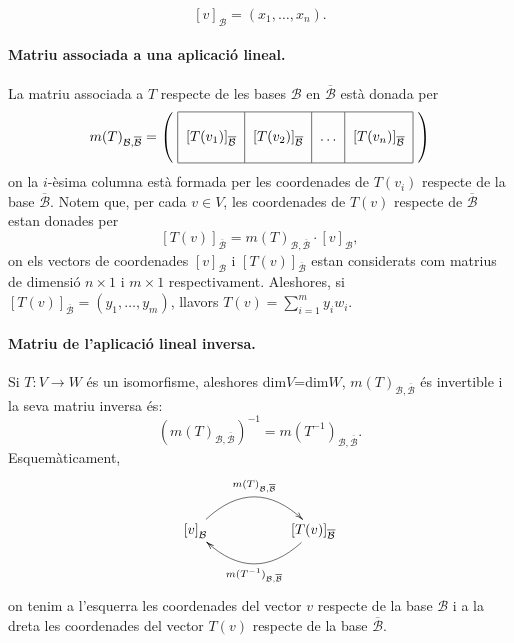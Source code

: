 \documentclass[12pt,a4paper]{article}
\begin{document}
\begin{equation}
\left[v\right]_{\mathcal{B}}=(x_{1},\ldots,x_{n}).
\end{equation}

\paragraph{\textbf{Matriu associada a una aplicació lineal.}} La matriu associada a $T$ respecte de les bases $\mathcal{B}$ en $\overline{\mathcal{B}}$ està donada per
\begin{equation}
m(T)_{\mathcal{B},\overline{\mathcal{B}}}=\left( \
\begin{tabular}{|c|c|c|c|}
\hline & & &\\
 $\left[T(v_{1})\right]_{\overline{\mathcal{B}}}$ & $\left[T(v_{2})\right]_{\overline{\mathcal{B}}}$ & $\ldots$ & $ \left[T(v_{n})\right]_{\overline{\mathcal{B}}}$ \\
  & & &  \\
\hline
\end{tabular}
\ \right)
\end{equation}
on la $i$-èsima columna està formada per les coordenades de $T(v_{i})$ respecte de la base $\overline{\mathcal{B}}$. Notem que, per cada $v \in V$, les coordenades de $T(v)$ respecte de $\overline{\mathcal{B}}$ estan donades per
\begin{equation} \label{eq:eq3}
\left[T(v)\right]_{\overline{\mathcal{B}}} = m(T)_{\mathcal{B},\overline{\mathcal{B}}} \cdot \left[v\right]_{\mathcal{B}},
\end{equation}
on els vectors de coordenades $\left[v\right]_{\mathcal{B}}$ i $\left[T(v)\right]_{\overline{\mathcal{B}}}$ estan considerats com matrius de dimensió $n \times 1$ i $m \times 1$ respectivament. Aleshores, si $\left[T(v)\right]_{\overline{\mathcal{B}}} = (y_{1},\ldots,y_{m})$, llavors $T(v)=\sum_{i=1}^{m}y_{i}w_{i}$.

\paragraph{\textbf{Matriu de l'aplicació lineal inversa.}} Si $T: V \rightarrow W$ és un isomorfisme, aleshores dim$V$=dim$W$, $m(T)_{\mathcal{B},\overline{\mathcal{B}}}$ és invertible i la seva matriu inversa és:
$$ \left(m(T)_{\mathcal{B},\overline{\mathcal{B}}}\right)^{-1} = m(T^{-1})_{\mathcal{B},\overline{\mathcal{B}}}.$$
Esquemàticament,
\begin{equation}
\xymatrix{ \left[v\right]_{\mathcal{B}} \ar@/^2pc/[rr]^{m(T)_{\mathcal{B},\overline{\mathcal{B}}}} & & \left[T(v)\right]_{\overline{\mathcal{B}}} \ar@/^2pc/[ll]^{m(T^{-1})_{\mathcal{B},\overline{\mathcal{B}}}}}
\end{equation}
on tenim a l'esquerra les coordenades del vector $v$ respecte de la base $\mathcal{B}$ i a la dreta les coordenades del vector $T(v)$ respecte de la base $\overline{\mathcal{B}}$.
\end{document}
